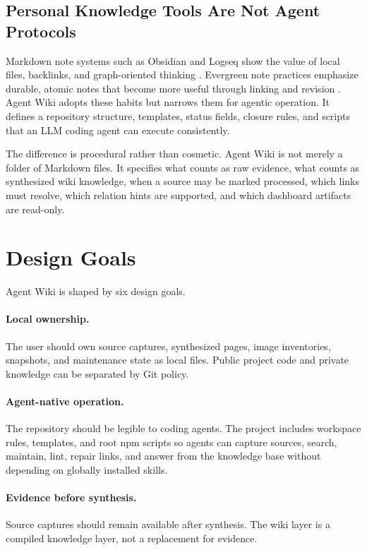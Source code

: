\documentclass[11pt]{article}
\begin{document}
\subsection{Personal Knowledge Tools Are Not Agent Protocols}

Markdown note systems such as Obsidian and Logseq show the value of local
files, backlinks, and graph-oriented thinking \cite{obsidian,logseq}. Evergreen
note practices emphasize durable, atomic notes that become more useful through
linking and revision \cite{matuschakEvergreen}. Agent Wiki adopts these habits
but narrows them for agentic operation. It defines a repository structure,
templates, status fields, closure rules, and scripts that an LLM coding agent
can execute consistently.

The difference is procedural rather than cosmetic. Agent Wiki is not merely a
folder of Markdown files. It specifies what counts as raw evidence, what counts
as synthesized wiki knowledge, when a source may be marked processed, which
links must resolve, which relation hints are supported, and which dashboard
artifacts are read-only.

\section{Design Goals}

Agent Wiki is shaped by six design goals.

\paragraph{Local ownership.}
The user should own source captures, synthesized pages, image inventories,
snapshots, and maintenance state as local files. Public project code and private
knowledge can be separated by Git policy.

\paragraph{Agent-native operation.}
The repository should be legible to coding agents. The project includes
workspace rules, templates, and root npm scripts so agents can capture sources,
search, maintain, lint, repair links, and answer from the knowledge base without
depending on globally installed skills.

\paragraph{Evidence before synthesis.}
Source captures should remain available after synthesis. The wiki layer is a
compiled knowledge layer, not a replacement for evidence.
\end{document}
